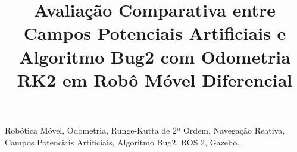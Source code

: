 \documentclass[conference]{IEEEtran}
\begin{document}
\title{Avaliação Comparativa entre Campos Potenciais Artificiais e Algoritmo Bug2 com Odometria RK2 em Robô Móvel Diferencial}

\author{
}

\maketitle

\begin{abstract}
\end{abstract}

\begin{IEEEkeywords}
Robótica Móvel, Odometria, Runge-Kutta de 2ª Ordem, Navegação Reativa, Campos Potenciais Artificiais, Algoritmo Bug2, ROS 2, Gazebo.
\end{IEEEkeywords}











\end{document}

